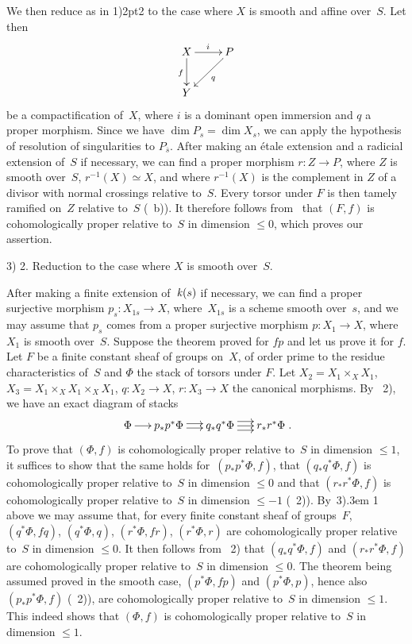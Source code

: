 We then reduce as in 1)\kern2pt2 to the case where $X$ is smooth
and affine over~$S$. Let then
$$
\xymatrix{ X \ar[r]^{i} \ar[d]_{f} & P \ar[ld]^{q} \\ Y }
$$
be a compactification of~$X$, where $i$ is a dominant open
immersion and $q$ a proper morphism. Since we have $\dim P_s=\dim X_s$,
we can apply the hypothesis of resolution of
singularities to $P_{\overline s}$. After making an
\'etale extension and a radicial extension of~$S$ if necessary, we can
find a proper morphism $r \colon Z \to P$, where $Z$ is smooth
over~$S$, $r^{-1}(X)\simeq X$, and where $r^{-1}(X)$ is the
complement in $Z$ of a divisor with normal crossings
relative to~$S$. Every torsor under $F$ is then
tamely ramified on~$Z$ relative to~$S$
(~b)). It therefore follows from~ that $(F,f)$
is cohomologically proper relative to~$S$ in dimension $\le
0$, which proves our assertion.

3) 2. Reduction to the case where $X$ is smooth over~$S$.
\par
After making a finite extension of~$\mathit{k}(s)$ if necessary, we can find a
proper surjective morphism $p_s\colon X_{1s}\to X$, where~$X_{1s}$
is a scheme smooth over~$s$, and we may assume that $p_s$
comes from a proper surjective morphism $p\colon X_1 \to X$, where
$X_1$ is smooth over~$S$. Suppose the theorem
proved for $fp$ and let us prove it for $f$. Let $F$ be a
finite constant sheaf of groups on~$X$, of order prime to the
residue characteristics of~$S$ and $\Phi$ the stack of
torsors under $F$. Let $X_2=X_1 \times_X X_1$, $X_3=X_1 \times_X
X_1 \times_X X_1$, $q\colon X_2 \to X$, $r\colon X_3 \to X$ the
canonical morphisms. By ~2), we have an
exact diagram of stacks
$$
\xymatrix@C=.5cm{\Phi \ar[r] & p_*p^*\Phi \ar@<2pt>[r]\ar@<-2pt>[r] &
q_*q^*\Phi \ar@<4pt>[r] \ar[r] \ar@<-4pt>[r] & r_*r^*\Phi}\quoi.
$$
To prove that $(\Phi,f)$ is cohomologically proper relative
to~$S$ in dimension $\le 1$, it suffices to show that the same
holds for~$(p_*p^*\Phi,f)$, that $(q_*q^*\Phi, f )$ is
cohomologically proper relative to~$S$ in dimension $\le 0$
and that $(r_*r^*\Phi,f)$ is cohomologically proper relative
to~$S$ in dimension $\le -1$ (~2)). By~3)\kern.3em 1
above we may assume that, for every finite constant sheaf of
groups~$F$, $(q^*\Phi,fq)$, $(q^*\Phi,q)$, $(r^*\Phi,fr)$, $(r^*\Phi,r)$
are cohomologically proper relative to~$S$ in dimension
$\le 0$. It then follows from ~2) that
$(q_*q^*\Phi,f)$ and $(r_*r^*\Phi,f)$ are cohomologically proper
relative to~$S$ in dimension $\le 0$. The theorem
being assumed proved in the smooth case, $(p^*\Phi,
fp)$ and $(p^*\Phi,p)$, hence also $(p_*p^*\Phi,f)$ (~2)),
are cohomologically proper relative to~$S$ in dimension
$\le 1$. This indeed shows that $(\Phi,f)$ is cohomologically proper
relative to~$S$ in dimension $\le 1$.

